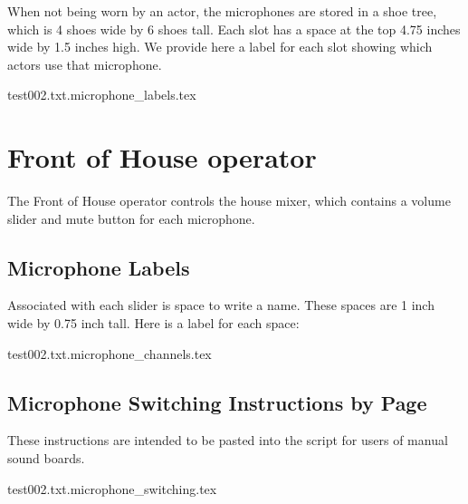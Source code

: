 \documentclass[letterpaper]{article}
\begin{document}
When not being worn by an actor, the microphones are stored in a shoe tree,
which is 4 shoes wide by 6 shoes tall.  
Each slot has a space at the top 4.75 inches wide
by 1.5 inches high.  We provide here a label for each slot showing which
actors use that microphone.

{\Large
 {test002.txt.microphone_labels.tex}
}

\section {Front of House operator}

The Front of House operator controls the house mixer, 
which contains a volume slider
and mute button for each microphone.  

\subsection {Microphone Labels}

Associated with each slider is space to write a name.  
These spaces are 1 inch wide by 0.75 inch tall.  
Here is a label for each space:

{\Large
 {test002.txt.microphone_channels.tex}
}

\subsection {Microphone Switching Instructions by Page}

These instructions are intended to be pasted into the script
for users of manual sound boards.

 {test002.txt.microphone_switching.tex}
\end{document}
